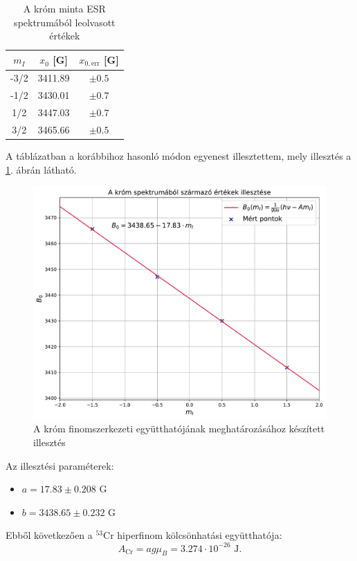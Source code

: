 \documentclass[12pt,a4paper]{article}
\begin{document}
\begin{table}[!h]
\begin{center}
\begin{tabular}{|c|c|c|}
\hline
$m_I$ & $x_0$ [G] & $x_{0,\textrm{err}}$ [G] \\
\hline
-3/2 & 3411.89 & $\pm 0.5$ \\
\hline
-1/2 & 3430.01 & $\pm 0.7$\\
\hline
1/2 & 3447.03 & $\pm 0.7$\\
\hline
3/2 & 3465.66 & $\pm 0.5$\\
\hline
\end{tabular}
\caption{A króm minta ESR spektrumából leolvasott értékek}
\label{tab:cr}
\end{center}
\end{table}

A táblázatban a korábbihoz hasonló módon egyenest illesztettem, mely illesztés a \ref{fig:cr_ill}. ábrán látható.\\

\begin{figure}[!h]
\centering
\includegraphics[scale=0.5]{cr_fl_fit}
\caption{A króm finomszerkezeti együtthatójának meghatározásához készített illesztés}
\label{fig:cr_ill}
\end{figure}
\newpage
Az illesztési paraméterek:
\begin{itemize}
\item{$a = 17.83 \pm 0.208$ G}
\item{$b = 3438.65 \pm 0.232$ G}
\end{itemize}
Ebből következően a $^{53}$Cr hiperfinom kölcsönhatási együtthatója:
$$A_{\textrm{Cr}}=ag\mu_B=3.274\cdot 10^{-26} \textrm{ J}. $$
\end{document}
